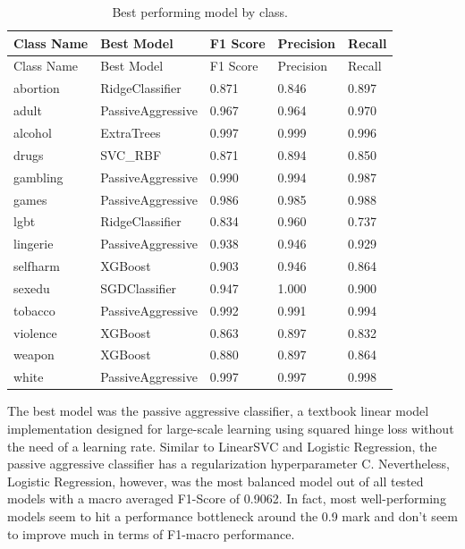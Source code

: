 \documentclass[
  titlepage]{article}
\begin{document}
\begin{longtable}[]{@{}lllll@{}}
\caption{Best performing model by class.}\tabularnewline
\toprule\noalign{}
Class Name & Best Model & F1 Score & Precision & Recall \\
\midrule\noalign{}
\endfirsthead
\toprule\noalign{}
Class Name & Best Model & F1 Score & Precision & Recall \\
\midrule\noalign{}
\endhead
\bottomrule\noalign{}
\endlastfoot
abortion & RidgeClassifier & 0.871 & 0.846 & 0.897 \\
adult & PassiveAggressive & 0.967 & 0.964 & 0.970 \\
alcohol & ExtraTrees & 0.997 & 0.999 & 0.996 \\
drugs & SVC\_RBF & 0.871 & 0.894 & 0.850 \\
gambling & PassiveAggressive & 0.990 & 0.994 & 0.987 \\
games & PassiveAggressive & 0.986 & 0.985 & 0.988 \\
lgbt & RidgeClassifier & 0.834 & 0.960 & 0.737 \\
lingerie & PassiveAggressive & 0.938 & 0.946 & 0.929 \\
selfharm & XGBoost & 0.903 & 0.946 & 0.864 \\
sexedu & SGDClassifier & 0.947 & 1.000 & 0.900 \\
tobacco & PassiveAggressive & 0.992 & 0.991 & 0.994 \\
violence & XGBoost & 0.863 & 0.897 & 0.832 \\
weapon & XGBoost & 0.880 & 0.897 & 0.864 \\
white & PassiveAggressive & 0.997 & 0.997 & 0.998 \\
\end{longtable}

The best model was the passive aggressive classifier, a textbook linear
model implementation designed for large-scale learning using squared
hinge loss without the need of a learning rate. Similar to LinearSVC and
Logistic Regression, the passive aggressive classifier has a
regularization hyperparameter C. Nevertheless, Logistic Regression,
however, was the most balanced model out of all tested models with a
macro averaged F1-Score of 0.9062. In fact, most well-performing models
seem to hit a performance bottleneck around the 0.9 mark and don't seem
to improve much in terms of F1-macro performance.
\end{document}
